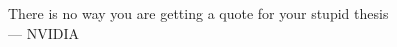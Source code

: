 \thispagestyle{empty}
{}

\vspace*{3cm}

\begin{center}    
    There is no way you are getting a quote for your stupid thesis\\ \medskip
    --- NVIDIA
\end{center}

\medskip
